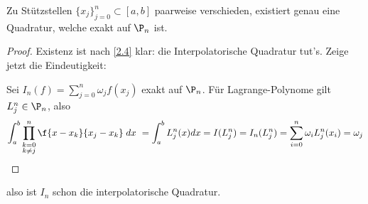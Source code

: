\documentclass[11pt]{scrbook}
\begin{document}
\begin{st}
	\label{2.5}
	Zu Stützstellen $\{x_j\}_{j=0}^n \subset [a,b]$ paarweise verschieden, existiert genau eine Quadratur, welche exakt auf $\P_n$ ist.
	\begin{proof}
		Existenz ist nach \ref{2.4} klar: die Interpolatorische Quadratur tut's.
		Zeige jetzt die Eindeutigkeit:

		Sei $I_n(f) = \sum_{j=0}^n \omega_j f(x_j)$ exakt auf $\P_n$.
		Für Lagrange-Polynome gilt $L_j^n \in \P_n$, also
		\[
			\int_{a}^b \prod_{\substack{k=0\\k\neq j}}^n \f {x-x_k}{x_j-x_k} \; dx \\\
			= \int_a^b L_j^n (x) dx = I(L_j^n) = I_n(L_j^n) = \sum_{i=0}^n \omega_i L_j^n(x_i) = \omega_j
		\]
	\end{proof}
	also ist $I_n$ schon die interpolatorische Quadratur.
\end{st}
\end{document}
